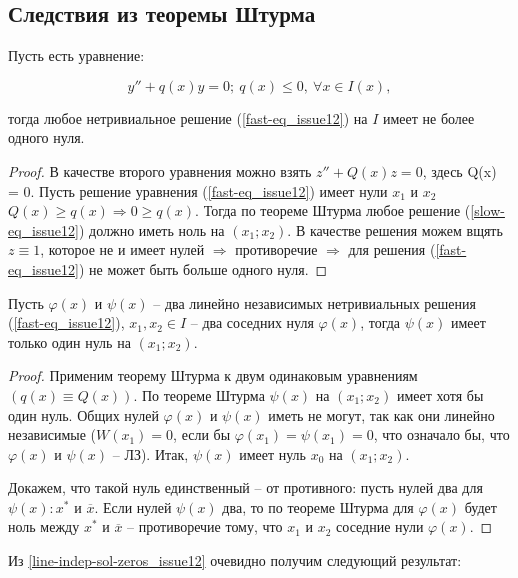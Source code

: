 \subsection{Следствия из теоремы Штурма}

\begin{corollary}\label{zero-quant_in-diff_issue12}
Пусть есть уравнение:

\[y'' + q(x)y = 0; \: q(x) \leqslant 0, \: \forall x \in I(x),\]

тогда любое нетривиальное решение (\ref{fast-eq_issue12}) на $I$ имеет не более одного нуля.
\end{corollary}

\begin{proof}
В качестве второго уравнения можно взять $z'' + Q(x)z = 0$, здесь Q(x) = 0. Пусть решение уравнения (\ref{fast-eq_issue12}) имеет нули $x_1$ и $x_2$ $Q(x) \geqslant q(x) \Rightarrow 0 \geqslant q(x)$. Тогда по теореме Штурма любое решение (\ref{slow-eq_issue12}) должно иметь ноль на $(x_1;x_2)$. В качестве решения можем вщять $z\equiv 1$, которое не и имеет нулей $\Rightarrow$ противоречие $\Rightarrow$ для решения (\ref{fast-eq_issue12}) не может быть больше одного нуля.
\end{proof}

\begin{corollary}\label{line-indep-sol-zeros_issue12}
Пусть $\varphi (x)$ и $\psi (x)$ -- два линейно независимых нетривиальных решения (\ref{fast-eq_issue12}), $x_1, x_2 \in I$ -- два соседних нуля $\varphi (x)$, тогда $\psi (x)$ имеет только один нуль на $(x_1;x_2)$.
\end{corollary}

\begin{proof}
Применим теорему Штурма к двум одинаковым уравнениям $(q(x) \equiv Q(x))$. По теореме Штурма $\psi (x)$ на $(x_1;x_2)$ имеет хотя бы один нуль. Общих нулей $\varphi (x)$ и $\psi (x)$ иметь не могут, так как они линейно независимые ($W(x_1) = 0$, если бы $\varphi (x_1) = \psi (x_1) = 0$, что означало бы, что $\varphi(x)$ и $\psi(x)$ -- ЛЗ). Итак, $\psi (x)$ имеет нуль $x_0$ на $(x_1;x_2)$.

Докажем, что такой нуль единственный -- от противного: пусть нулей два для $\psi (x): x^*$ и $\overline{x}$. Если нулей $\psi (x)$ два, то по теореме Штурма для $\varphi (x)$ будет ноль между $x^*$ и $\overline{x}$ -- противоречие тому, что $x_1$ и $x_2$ соседние нули $\varphi (x)$.
\end{proof}

Из \ref{line-indep-sol-zeros_issue12} очевидно получим следующий результат:


